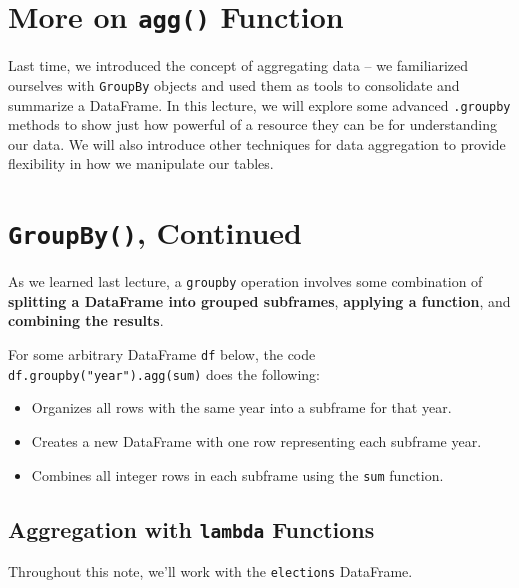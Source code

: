\documentclass[
  letterpaper,
  DIV=11,
  numbers=noendperiod]{scrreprt}
\providecommand{\tightlist}{%
  \setlength{\itemsep}{0pt}\setlength{\parskip}{0pt}}\usepackage{longtable,booktabs,array}
\begin{document}
\hypertarget{more-on-agg-function}{%
\section{\texorpdfstring{More on \texttt{agg()}
Function}{More on agg() Function}}\label{more-on-agg-function}}

Last time, we introduced the concept of aggregating data -- we
familiarized ourselves with \texttt{GroupBy} objects and used them as
tools to consolidate and summarize a DataFrame. In this lecture, we will
explore some advanced \texttt{.groupby} methods to show just how
powerful of a resource they can be for understanding our data. We will
also introduce other techniques for data aggregation to provide
flexibility in how we manipulate our tables.

\hypertarget{groupby-continued}{%
\section{\texorpdfstring{\texttt{GroupBy()},
Continued}{GroupBy(), Continued}}\label{groupby-continued}}

As we learned last lecture, a \texttt{groupby} operation involves some
combination of \textbf{splitting a DataFrame into grouped subframes},
\textbf{applying a function}, and \textbf{combining the results}.

For some arbitrary DataFrame \texttt{df} below, the code
\texttt{df.groupby("year").agg(sum)} does the following:

\begin{itemize}
\tightlist
\item
  Organizes all rows with the same year into a subframe for that year.
\item
  Creates a new DataFrame with one row representing each subframe year.
\item
  Combines all integer rows in each subframe using the \texttt{sum}
  function.
\end{itemize}

\hypertarget{aggregation-with-lambda-functions}{%
\subsection{\texorpdfstring{Aggregation with \texttt{lambda}
Functions}{Aggregation with lambda Functions}}\label{aggregation-with-lambda-functions}}

Throughout this note, we'll work with the \texttt{elections} DataFrame.
\end{document}
